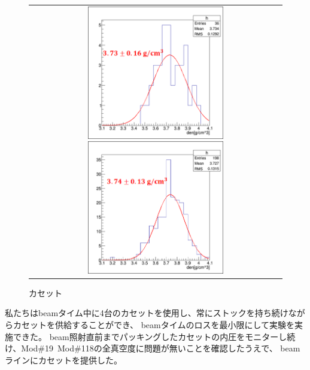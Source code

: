 \documentclass[12pt,a4paper]{jarticle}
\begin{document}
\begin{figure}[htbp]
  \centering
      \begin{tabular}{c}
        \begin{minipage}{0.5\hsize}
          \centering
            \includegraphics[clip, width=60mm]{1stRun_thin_den.png}
            \hspace{1.6cm} 
            \caption{E07セットアップ\label{fig:e07setup}}
        \end{minipage}
        
        \begin{minipage}{0.5\hsize}
          \centering
            \includegraphics[clip, width=60mm]{2ndRun_thin_den.png}
            \hspace{1.6cm} 
            \caption{カセット\label{fig:casette}}
        \end{minipage}
    
      \end{tabular}
\end{figure}
\par
私たちはbeamタイム中に4台のカセットを使用し、常にストックを持ち続けながらカセットを供給することができ、
beamタイムのロスを最小限にして実験を実施できた。
beam照射直前までパッキングしたカセットの内圧をモニターし続け、Mod$\#$19~Mod$\#$118の全真空度に問題が無いことを確認したうえで、
beamラインにカセットを提供した。
\end{document}

